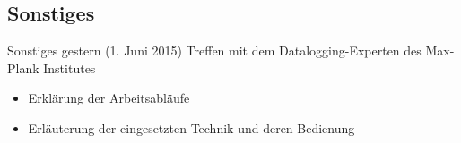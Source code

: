 \documentclass{beamer}
\begin{document}
\begin{frame}
 \section{Sonstiges}
 \begin{block}{Sonstiges}
  gestern (1. Juni 2015) Treffen mit dem Datalogging-Experten des Max-Plank Institutes
  \begin{itemize}
  \item Erklärung der Arbeitsabläufe
  \item Erläuterung der eingesetzten Technik und deren Bedienung
  \end{itemize}
  \end{block}
\end{frame}
\end{document}
